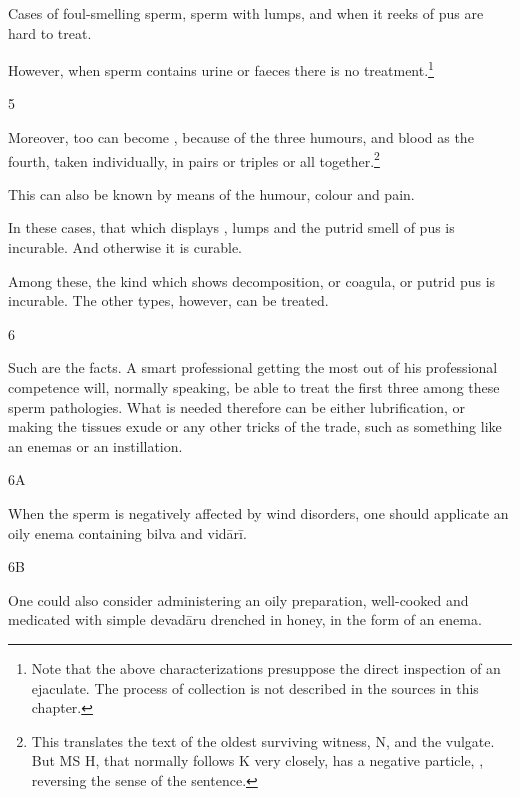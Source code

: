 \begin{translation}
Cases of foul-smelling sperm, sperm with lumps, and when it reeks of
pus are hard to treat.
  
  
   However, when sperm contains urine or faeces there is no
treatment.\footnote{Note that the above characterizations presuppose
    the direct inspection of an ejaculate.  The process of collection is
    not described in the sources in this chapter.}
 
 \item[5]
 
 Moreover,  too can become
,  because of the three
humours, and blood as the fourth, taken individually, in pairs or
triples or all together.\footnote{This translates the text of the oldest
    surviving witness, N, and the vulgate.  But MS H, that normally follows
    K very closely, has a negative particle, , reversing the sense
    of the sentence.}
 
 This can also be known by means of the humour, colour and pain.
 
 In these cases, that which displays , lumps 
 and the putrid smell of pus is incurable. And otherwise it is curable.
 
 
  Among these, the kind which shows decomposition, or coagula, or 
  putrid pus is incurable. The other types, however, can be treated.  
 
 \item[6]
 
 Such are the facts. A smart professional getting the most out of his 
 professional competence will, normally speaking, be able to treat the first three 
 among these sperm pathologies. What is needed therefore can be either 
 lubrification, or making the tissues exude or any other tricks of the trade, such 
 as something like an enemas or an instillation.
 
 \item[6A]
 
  When the sperm is negatively affected by wind disorders, one should applicate 
  an oily enema containing \gls{bilva} and \gls{vidārī}. 
 
 \item[6B]
 
  One could also consider administering an oily preparation, well-cooked and 
  medicated with simple \gls{devadāru} drenched in honey, in the form of an 
  enema. 
 

\end{translation}
